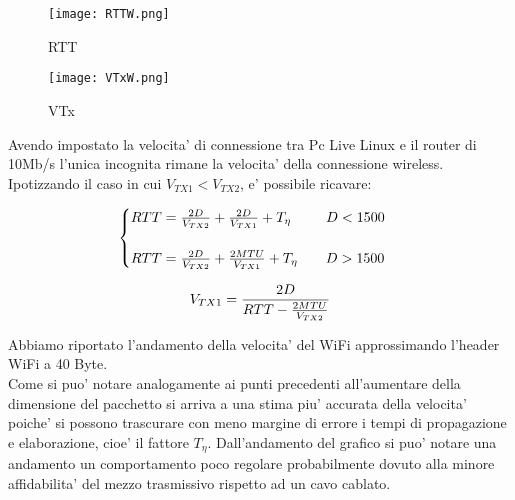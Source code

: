 \documentclass[../lab2.tex]{subfiles}
\begin{document}
    \begin{figure}[!htb]
        \begin{minipage}{0.48\textwidth}
            \centering
            \texttt{[image: RTTW.png]}
            \vspace{-20pt}
            \caption{RTT}\label{RTTW}
        \end{minipage}\hfill
        \begin{minipage}{0.48\textwidth}
            \centering
            \texttt{[image: VTxW.png]}
            \vspace{-20pt}
            \caption{VTx}\label{VTxW}
        \end{minipage}
    \end{figure}

    Avendo impostato la velocita' di connessione tra Pc Live Linux e il router di 10Mb/s
    l'unica incognita rimane la velocita' della connessione wireless.
    Ipotizzando il caso in cui $V_{TX1} < V_{TX2}$, e' possibile ricavare:

    \begin{equation}
        \centering
        \begin{cases}
            RTT = \frac{2D}{V_{TX2}} +\frac{2D}{V_{TX1}} + T_\eta  \qquad \, \, \, D < 1500 \\
            \\
            RTT = \frac{2D}{V_{TX2}} +\frac{2MTU}{V_{TX1}} + T_\eta  \qquad D > 1500
        \end{cases}
    \end{equation}

    \begin{equation}
        \centering
        V_{TX1} = \frac{2D}{RTT - \frac{2MTU}{V_{TX2}}} 
    \end{equation}
    
    \vspace{10pt}

    Abbiamo riportato l'andamento della velocita' del WiFi approssimando l'header WiFi a
    40 Byte. \\
    Come si puo' notare analogamente ai punti precedenti all'aumentare della dimensione
    del pacchetto si arriva a una stima piu' accurata della velocita' poiche' si possono 
    trascurare con meno margine di errore i tempi di propagazione e elaborazione, 
    cioe' il fattore $T_\eta$.
    Dall'andamento del grafico si puo' notare una andamento un comportamento poco
    regolare probabilmente dovuto alla minore affidabilita' del mezzo trasmissivo 
    rispetto ad un cavo cablato.
\end{document}
